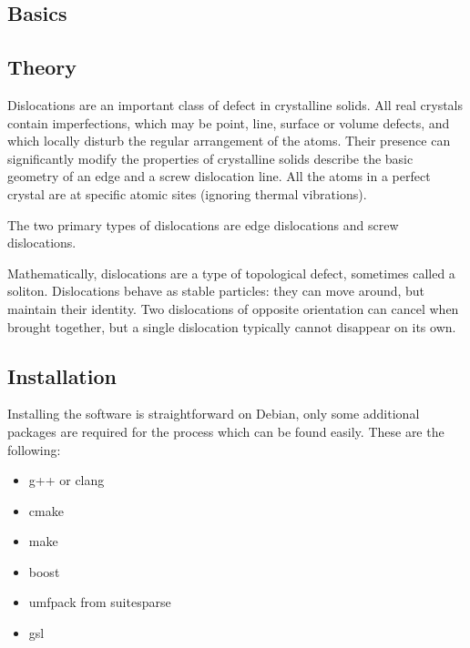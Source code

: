 \documentclass[12pt,a4paper]{article}
\theoremstyle{plain}
\begin{document}
\begin{multicols*}{2}

	\section{Basics}
	\vspace{0.2cm}

	\subsection{Theory}

	Dislocations are an important class of
	defect in crystalline solids.
	All real crystals contain imperfections,
	which may be point, line, surface or
	volume defects, and which locally disturb
	the regular arrangement of the atoms.
	Their presence can significantly modify
	the properties of crystalline solids
	describe the basic geometry of an edge and
	a screw dislocation line. All the atoms in
	a perfect crystal are at specific atomic
	sites (ignoring thermal vibrations). \cite{random}

	\vspace{0.1cm}

	The two primary types of dislocations
	are edge dislocations and screw dislocations.

	\vspace{0.1cm}

	Mathematically, dislocations are a
	type of topological defect, sometimes
	called a soliton. Dislocations behave as
	stable particles: they can move around,
	but maintain their identity. Two dislocations
	of opposite orientation can cancel when
	brought together, but a single dislocation
	typically cannot disappear on its own. \cite{wiki}

	\subsection{Installation}

	\par Installing the software is straightforward on Debian, only some additional packages are required
	for the process which can be found easily. These are the following:

	\begin{itemize}
		\item g++ or clang
		\item cmake
		\item make
		\item boost
		\item umfpack from suitesparse
		\item gsl
	\end{itemize}


\end{multicols*}
\end{document}
